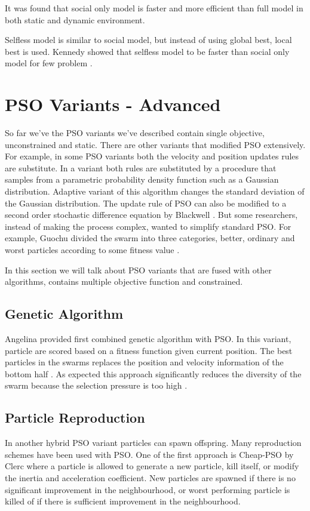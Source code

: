 \documentclass{article}
\begin{document}
It was found that social only model is faster and more efficient than full model in both static and dynamic environment. \cite{kennedy1997particle, carlisle2000adapting}

Selfless model is similar to social model, but instead of using global best, local best is used. Kennedy showed that selfless model to be faster than social only model for few problem \cite{kennedy1997particle}.

\section{PSO Variants - Advanced}
So far we've the PSO variants we've described contain single objective, unconstrained and static. There are other variants that modified PSO extensively. For example, in some PSO variants both the velocity and position updates rules are substitute. In a variant both rules are substituted by a procedure that samples from a parametric probability density function such as a Gaussian distribution. Adaptive variant of this algorithm changes the standard deviation of the Gaussian distribution. The update rule of PSO can also be modified to a second order stochastic difference equation by Blackwell \cite{blackwell2011study}. But some researchers, instead of making the process complex, wanted to simplify standard PSO. For example, Guochu divided the swarm into three categories, better, ordinary and worst particles according to some fitness value \cite{chen2010simplified}.

In this section we will talk about PSO variants that are fused with other algorithms, contains multiple objective function and constrained.

\subsection{Genetic Algorithm}
Angelina provided first combined genetic algorithm with PSO. In this variant, particle are scored based on a fitness function given current position. The best particles in the swarms replaces the position and velocity information of the bottom half \cite{angeline1998using}. As expected this approach significantly reduces the diversity of the swarm because the selection pressure is too high \cite{higashi2003particle}.

\subsection{Particle Reproduction}
In another hybrid PSO variant particles can spawn offspring. Many reproduction schemes have been used with PSO. One of the first approach is Cheap-PSO by Clerc \cite{clerc1999swarm} where a particle is allowed to generate a new particle, kill itself, or modify the inertia and acceleration coefficient. New particles are spawned if there is no significant improvement in the neighbourhood, or worst performing particle is killed of if there is sufficient improvement in the neighbourhood.
\end{document}
